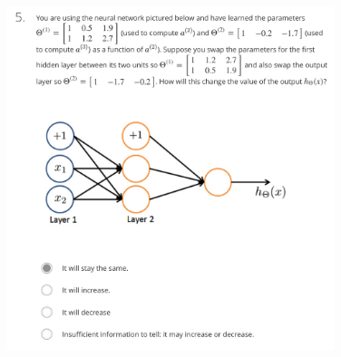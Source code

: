 \documentclass[12pt, A4,onecolumn]{article} %
\begin{document}
\begin{figure}[H]
	\centering
	\includegraphics[width=0.85\textwidth]{./ImagenesW4/testNN5}
\end{figure}

\end{document}
